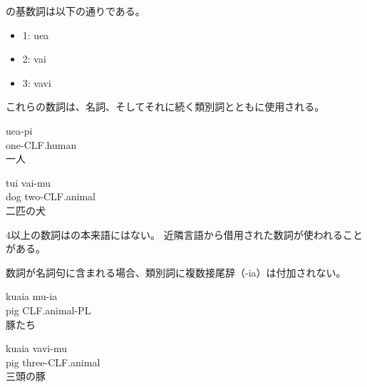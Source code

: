 \langname の基数詞は以下の通りである。
\begin{itemize}
    \item 1: uea
    \item 2: vai
    \item 3: vavi
\end{itemize}

これらの数詞は、名詞、そしてそれに続く類別詞とともに使用される。
\begin{exe}
    \ex \gll uea-pi \\
    one-CLF.human \\
    \glt 一人
\end{exe}
\begin{exe}
    \ex \gll tui vai-mu \\
    dog two-CLF.animal \\
    \glt 二匹の犬
\end{exe}

4以上の数詞は\langname の本来語にはない。
近隣言語から借用された数詞が使われることがある。


数詞が名詞句に含まれる場合、類別詞に複数接尾辞（-ia）は付加されない。
\begin{exe}
    \ex \gll kuaia mu-ia \\
    pig CLF.animal-PL \\
    \glt 豚たち
\end{exe}
\begin{exe}
    \ex \gll kuaia vavi-mu \\
    pig three-CLF.animal \\
    \glt 三頭の豚
\end{exe}

